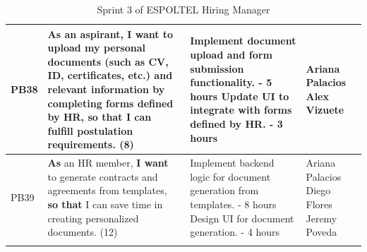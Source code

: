 \documentclass{scrreprt}
\begin{document}
\begin{longtable}{|p{1.5cm}|p{5.5cm}|p{4.5cm}|p{3cm}|}
	PB38 & \textbf{As} an aspirant, \textbf{I want} to upload my personal documents (such as CV, ID, certificates, etc.) and relevant information \textbf{by completing forms defined by HR,} \textbf{so that} I can fulfill postulation requirements. (8) &
	Implement document upload and form submission functionality. - 5 hours \newline
	Update UI to integrate with forms defined by HR. - 3 hours &
	Ariana Palacios \newline
	Alex Vizuete \\ \hline
	
	PB39 & \textbf{As} an HR member, \textbf{I want} to generate contracts and agreements from templates, \textbf{so that} I can save time in creating personalized documents. (12) &
	Implement backend logic for document generation from templates. - 8 hours \newline
	Design UI for document generation. - 4 hours &
	Ariana Palacios \newline
	Diego Flores \newline
	Jeremy Poveda \\ \hline
	
	\caption{Sprint 3 of ESPOLTEL Hiring Manager}
\end{longtable}
\end{document}
